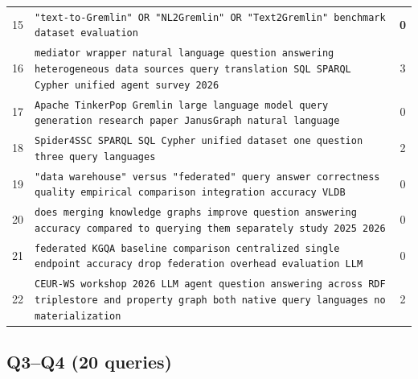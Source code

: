 \documentclass[11pt,a4paper]{article}
\begin{document}
\begin{center}
\begin{longtable}{@{}c>{\RaggedRight}p{13.6cm}c@{}}
15 & \texttt{"text-to-Gremlin" OR "NL2Gremlin" OR "Text2Gremlin" benchmark dataset evaluation} & \textbf{0} \\
16 & \texttt{mediator wrapper natural language question answering heterogeneous data sources query translation SQL SPARQL Cypher unified agent survey 2026} & 3 \\
17 & \texttt{Apache TinkerPop Gremlin large language model query generation research paper JanusGraph natural language} & 0 \\
18 & \texttt{Spider4SSC SPARQL SQL Cypher unified dataset one question three query languages} & 2 \\
19 & \texttt{"data warehouse" versus "federated" query answer correctness quality empirical comparison integration accuracy VLDB} & 0 \\
20 & \texttt{does merging knowledge graphs improve question answering accuracy compared to querying them separately study 2025 2026} & 0 \\
21 & \texttt{federated KGQA baseline comparison centralized single endpoint accuracy drop federation overhead evaluation LLM} & 0 \\
22 & \texttt{CEUR-WS workshop 2026 LLM agent question answering across RDF triplestore and property graph both native query languages no materialization} & 2 \\
\bottomrule
\end{longtable}
\end{center}

\subsection{Q3--Q4 (20 queries)}
\end{document}
